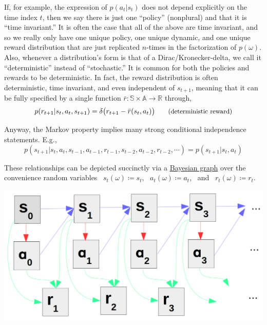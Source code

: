 If, for example, the expression of $p(a_t|s_t)$ does not depend explicitly on the time index $t$, then we say there is just one ``policy'' (nonplural) and that it is ``time invariant.'' It is often the case that all of the above are time invariant, and so we really only have one unique policy, one unique dynamic, and one unique reward distribution that are just replicated $n$-times in the factorization of $p(\omega)$.\\

Also, whenever a distribution's form is that of a Dirac/Kronecker-delta, we call it ``deterministic'' instead of ``stochastic.'' It is common for both the policies and rewards to be deterministic. In fact, the reward distribution is often deterministic, time invariant, and even independent of $s_{t+1}$, meaning that it can be fully specified by a single function $\bar{r}:\mathbb{S}\times\mathbb{A} \to \mathbb{R}$ through,
\begin{equation*}
p(r_{t+1}|s_t,a_t,s_{t+1}) = \delta\big{(}r_{t+1} - \bar{r}(s_t, a_t)\big{)} \small{\tag{deterministic reward}}
\end{equation*}

Anyway, the Markov property implies many strong conditional independence statements. E.g.,
\begin{equation*}
p(s_{t+1}|s_t,a_t,s_{t-1},a_{t-1},r_{t-1},s_{t-2},a_{t-2},r_{t-2},\cdots) = p(s_{t+1}|s_t,a_t)
\end{equation*}

These relationships can be depicted succinctly via a \href{https://en.wikipedia.org/wiki/Bayesian_network}{Bayesian graph} over the convenience random variables \ ${s_t}(\omega) \coloneqq s_t$, \ ${a_t}(\omega) \coloneqq a_t$, \ and \ ${r_t}(\omega) \coloneqq r_t$.
\begin{center}
  \includegraphics[width=\linewidth-1.5in]{include/bayesian_graph.png}
\end{center}

